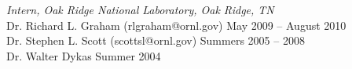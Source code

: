 {\sl Intern, Oak Ridge National Laboratory, Oak Ridge, TN} \\
Dr. Richard L. Graham (rlgraham@ornl.gov) \hfill May 2009 -- August 2010  \\
Dr. Stephen L. Scott (scottsl@ornl.gov) \hfill Summers 2005 -- 2008 \\
Dr. Walter Dykas \hfill Summer 2004 \\
%
